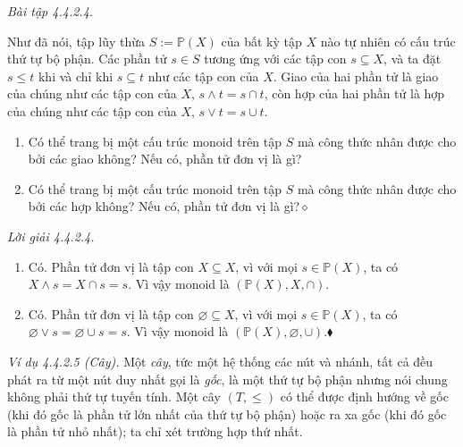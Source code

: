 \noindent\textit{Bài tập 4.4.2.4.}\keepwithnext

Như đã nói, tập lũy thừa $S:=\mathbb{P}(X)$ của bất kỳ tập $X$ nào tự nhiên có cấu trúc thứ tự bộ phận. Các phần tử $s\in S$ tương ứng với các tập con $s\subseteq X$, và ta đặt $s\le t$ khi và chỉ khi $s\subseteq t$ như các tập con của $X$. Giao của hai phần tử là giao của chúng như các tập con của $X$, $s\wedge t=s\cap t$, còn hợp của hai phần tử là hợp của chúng như các tập con của $X$, $s\vee t=s\cup t$.
\begin{enumerate}[label=\alph*.]
\item Có thể trang bị một cấu trúc monoid trên tập $S$ mà công thức nhân được cho bởi các giao không? Nếu có, phần tử đơn vị là gì?
\item Có thể trang bị một cấu trúc monoid trên tập $S$ mà công thức nhân được cho bởi các hợp không? Nếu có, phần tử đơn vị là gì?\nobreak\hfill$\diamond$
\end{enumerate}

\noindent\textit{Lời giải 4.4.2.4.}\keepwithnext
\begin{enumerate}[label=\alph*.]
\item Có. Phần tử đơn vị là tập con $X\subseteq X$, vì với mọi $s\in\mathbb{P}(X)$, ta có $X\wedge s=X\cap s=s$. Vì vậy monoid là $(\mathbb{P}(X),X,\cap)$.
\item Có. Phần tử đơn vị là tập con $\varnothing\subseteq X$, vì với mọi $s\in\mathbb{P}(X)$, ta có $\varnothing\vee s=\varnothing\cup s=s$. Vì vậy monoid là $(\mathbb{P}(X),\varnothing,\cup)$.\nobreak\hfill$\blacklozenge$
\end{enumerate}

\noindent\textit{Ví dụ 4.4.2.5 (Cây).} Một \emph{cây}, tức một hệ thống các nút và nhánh, tất cả đều phát ra từ một nút duy nhất gọi là \emph{gốc}, là một thứ tự bộ phận nhưng nói chung không phải thứ tự tuyến tính. Một cây $(T,\le)$ có thể được định hướng về gốc (khi đó gốc là phần tử lớn nhất của thứ tự bộ phận) hoặc ra xa gốc (khi đó gốc là phần tử nhỏ nhất); ta chỉ xét trường hợp thứ nhất.

